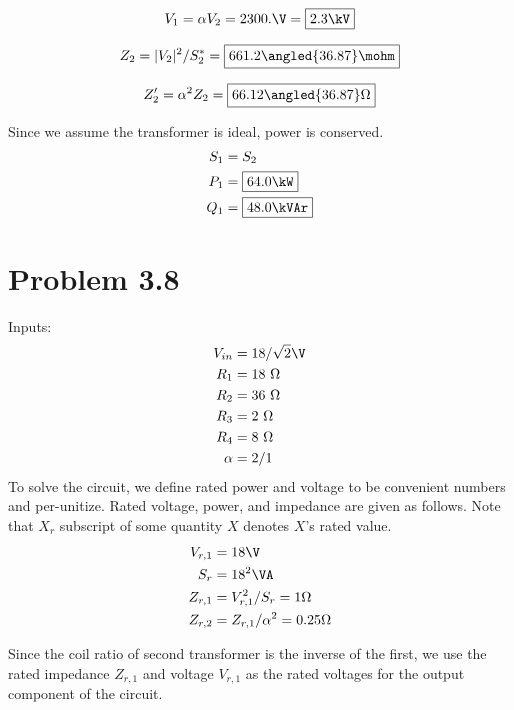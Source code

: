 \documentclass{homework}
\begin{document}
\begin{letterenum}
    \item \begin{equation*}
        V_1 = \alpha V_2 = 2300. \V = \boxed{2.3 \kV}
    \end{equation*}
    \item \begin{equation*}
        Z_2 = |V_2|^2 / S_2^* = \boxed{661.2 \angled{36.87} \mohm} 
    \end{equation*}
    \item \begin{equation*}
        Z_2' = \alpha^2 Z_2 = \boxed{66.12 \angled{36.87} \ohm}
    \end{equation*}
    \item Since we assume the transformer is ideal, power is conserved.
    \begin{align*}
        S_1 &= S_2 \\
        P_1 &= \boxed{64.0 \kW} \\
        Q_1 &= \boxed{48.0 \kVAr}
    \end{align*}
\end{letterenum}

\section{Problem 3.8}
Inputs:
\begin{align*}
    V_{in} &= 18/\sqrt{2} \V \\
    R_1 &= 18 \text{ } \ohm \\
    R_2 &= 36 \text{ } \ohm \\
    R_3 &= 2 \text{ } \ohm \\
    R_4 &= 8 \text{ } \ohm \\
    \alpha &= 2 / 1
\end{align*}
To solve the circuit, we define rated power and voltage to be convenient
numbers and per-unitize.
Rated voltage, power, and impedance are given as follows.
Note that $X_r$ subscript of some quantity $X$ denotes $X$'s rated value.
\begin{align*}
    V_{r,1} &= 18 \V \\
    S_r &= 18^2 \VA \\
    Z_{r,1} &= V_{r,1}^2 / S_r = 1 \ohm \\
    Z_{r,2} &= Z_{r,1} / \alpha^2 = 0.25 \ohm
\end{align*}

Since the coil ratio of second transformer is the inverse of the first,
we use the rated impedance $Z_{r,1}$ and voltage $V_{r,1}$ as the rated
voltages for the output component of the circuit.
\end{document}
